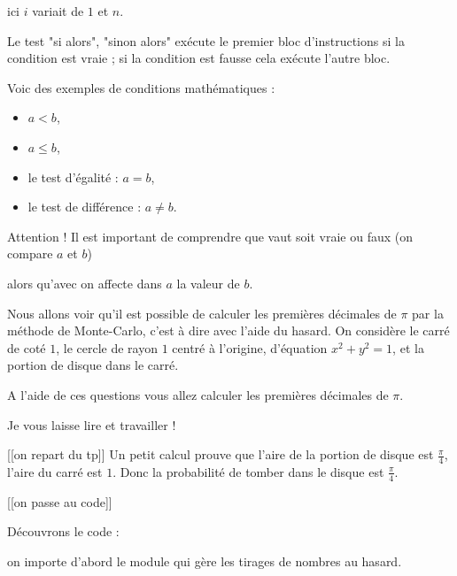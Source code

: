 ici $i$ variait de  $1$ et $n$.

\change

Le test "si alors", "sinon alors" exécute le premier 
  bloc d'instructions si la condition est vraie ; 
   si la condition est fausse cela exécute l'autre bloc.
  
\change

Voic des exemples de conditions mathématiques :
  \begin{itemize}
     \item $a<b$,
     \item $a \le b$,
     \item le test d'égalité : $a=b$,
     \item le test de différence : $a \neq b$.
  \end{itemize}   
  
  
\change

Attention ! Il est important de comprendre que  
vaut soit vraie ou faux (on compare $a$ et $b$)

\change

  alors qu'avec  on affecte dans $a$ la valeur de $b$. 
  
  

\diapo


Nous allons voir qu'il est possible de calculer les premières 
décimales de $\pi$ par la méthode de Monte-Carlo, 
c'est à dire avec l'aide du hasard.
On considère le carré de coté $1$, le cercle de rayon $1$ 
centré à l'origine, d'équation $x^2+y^2=1$,
et la portion de disque dans le carré.

A l'aide de ces questions vous allez calculer les premières 
décimales de $\pi$.

Je vous laisse lire et travailler !

\diapo

[[on repart du tp]]
Un petit calcul prouve que l'aire de la portion de disque est 
$\frac{\pi}{4}$, l'aire du carré est $1$. 
  Donc la probabilité de tomber dans le disque est $\frac{\pi}{4}$.

[[on passe au code]]
  
\change

Découvrons le code :

on importe d'abord le module qui gère les tirages de nombres au hasard.

\change

